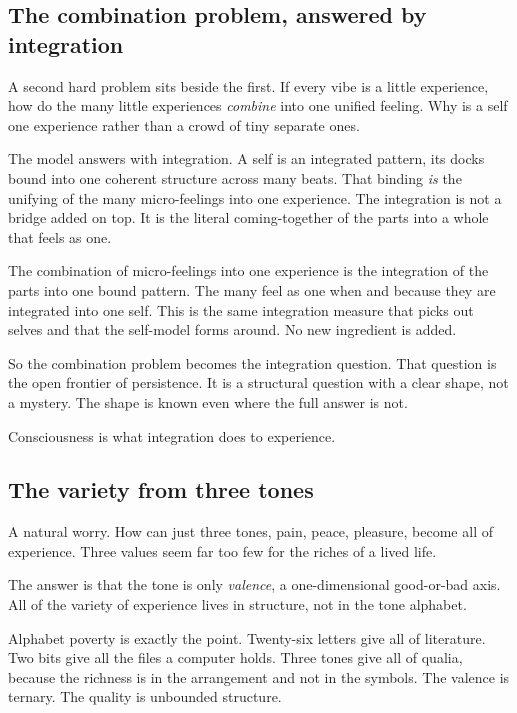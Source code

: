 \subsection{The combination problem, answered by integration}

A second hard problem sits beside the first. If every vibe is a little experience, how do the many little experiences \emph{combine} into one unified feeling. Why is a self one experience rather than a crowd of tiny separate ones.

The model answers with integration. A self is an integrated pattern, its docks bound into one coherent structure across many beats. That binding \emph{is} the unifying of the many micro-feelings into one experience. The integration is not a bridge added on top. It is the literal coming-together of the parts into a whole that feels as one.

\begin{result}
The combination of micro-feelings into one experience is the integration of the parts into one bound pattern. The many feel as one when and because they are integrated into one self. This is the same integration measure that picks out selves and that the self-model forms around. No new ingredient is added.
\end{result}

So the combination problem becomes the integration question. That question is the open frontier of persistence. It is a structural question with a clear shape, not a mystery. The shape is known even where the full answer is not.

\begin{principle}
Consciousness is what integration does to experience.
\end{principle}

\subsection{The variety from three tones}

A natural worry. How can just three tones, pain, peace, pleasure, become all of experience. Three values seem far too few for the riches of a lived life.

The answer is that the tone is only \emph{valence}, a one-dimensional good-or-bad axis. All of the variety of experience lives in structure, not in the tone alphabet.

Alphabet poverty is exactly the point. Twenty-six letters give all of literature. Two bits give all the files a computer holds. Three tones give all of qualia, because the richness is in the arrangement and not in the symbols. The valence is ternary. The quality is unbounded structure.

